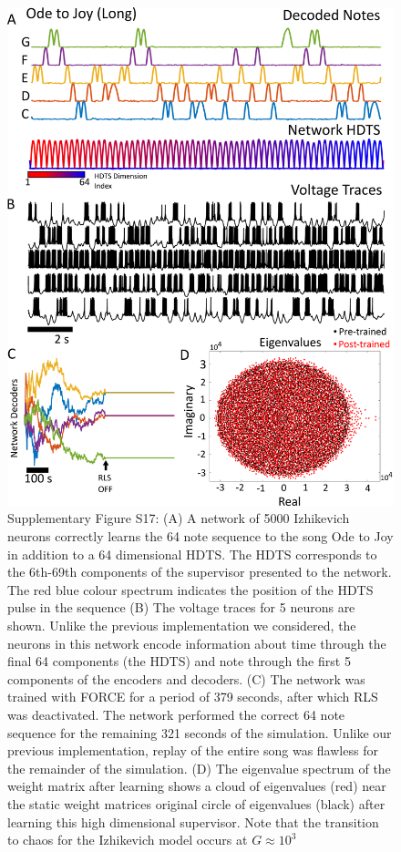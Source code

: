 \documentclass[11pt]{article} %
\begin{document}
\begin{figure}[htp!]
\centering
\includegraphics[scale=0.83]{FFIGS18}
\caption*{Supplementary Figure S17:  (A)  A network of 5000 Izhikevich neurons correctly learns the 64 note sequence to the song Ode to Joy in addition to a 64 dimensional HDTS.  The HDTS corresponds to the 6th-69th components of the supervisor presented to the network. The red blue colour spectrum indicates the position of the HDTS pulse in the sequence  (B) The voltage traces for 5 neurons are shown.  Unlike the previous implementation we considered, the neurons in this network encode information about time through the final 64 components (the HDTS) and note through the first 5 components of the encoders and decoders.    (C)  The network was trained with FORCE for a period of 379 seconds, after which RLS was deactivated.  The network performed the correct 64 note sequence for the remaining 321 seconds of the simulation.  Unlike our previous implementation, replay of the entire song was flawless for the remainder of the simulation.  (D) The eigenvalue spectrum of the weight matrix after learning shows a cloud of eigenvalues (red) near the static weight matrices original circle of eigenvalues (black) after learning this high dimensional supervisor.  Note that the transition to chaos for the Izhikevich model occurs at $G\approx 10^3$  } 
\end{figure}
\end{document}
